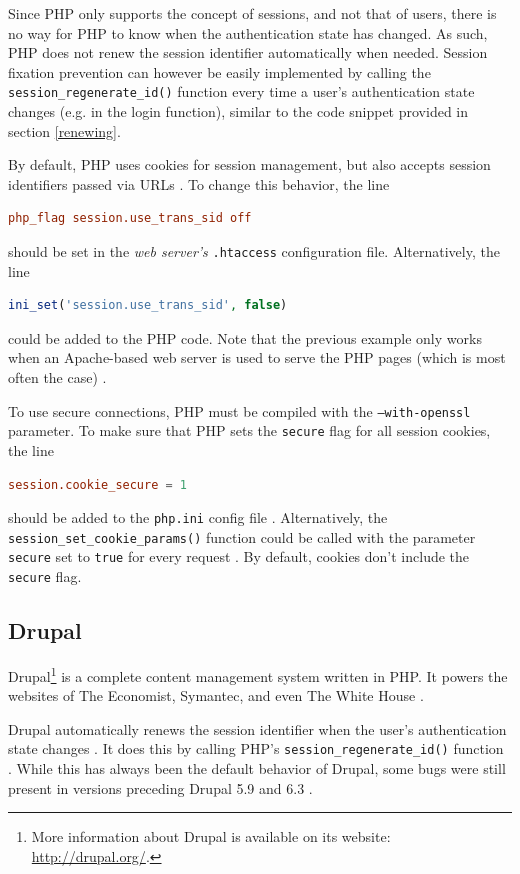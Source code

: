 Since PHP only supports the concept of sessions, and not that of users, there is no way for PHP to know when the authentication state has changed. As such, PHP does not renew the session identifier automatically when needed. Session fixation prevention can however be easily implemented by calling the \texttt{session\_regenerate\_id()} function every time a user's authentication state changes (e.g. in the login function), similar to the code snippet provided in section \ref{renewing}.

By default, PHP uses cookies for session management, but also accepts session identifiers passed via URLs \cite{Holovaty2008}. To change this behavior, the line
\begin{lstlisting}[language=conf]
php_flag session.use_trans_sid off
\end{lstlisting}
should be set in the \emph{web server's} \texttt{.htaccess} configuration file. Alternatively, the line
\begin{lstlisting}[language=PHP]
ini_set('session.use_trans_sid', false)
\end{lstlisting}
could be added to the PHP code. Note that the previous example only works when an Apache-based web server is used to serve the PHP pages (which is most often the case) \cite{PHPdisableURL}.

To use secure connections, PHP must be compiled with the \texttt{--with-openssl} parameter. To make sure that PHP sets the \texttt{secure} flag for all session cookies, the line
\begin{lstlisting}[language=conf]
session.cookie_secure = 1
\end{lstlisting}
should be added to the \texttt{php.ini} config file \cite{PHPsessionsecure}. Alternatively, the \texttt{session\_set\_cookie\_params()} function could be called with the parameter \texttt{secure} set to \texttt{true} for every request \cite{PHPsessionCookieParams}. By default, cookies don't include the \texttt{secure} flag.

\subsection{Drupal}

Drupal\footnote{More information about Drupal is available on its website: \url{http://drupal.org/}.} is a complete content management system written in PHP. It powers the websites of The Economist, Symantec, and even The White House \cite{DrupalCases,DrupalWhiteHouse}.

Drupal automatically renews the session identifier when the user's authentication state changes \cite{DrupalAuth}. It does this by calling PHP's \texttt{session\_regenerate\_id()} function \cite{DrupalRegenerate}. While this has always been the default behavior of Drupal, some bugs were still present in versions preceding Drupal 5.9 and 6.3 \cite{DrupalBug}.

